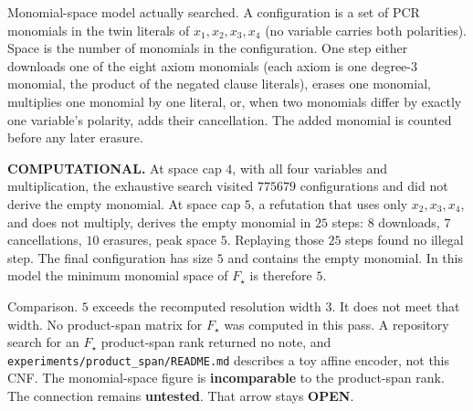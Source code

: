 \documentclass[11pt]{article}
\begin{document}
Monomial-space model actually searched.
A configuration is a set of PCR monomials in the twin literals of \(x_1,x_2,x_3,x_4\)
(no variable carries both polarities).
Space is the number of monomials in the configuration.
One step either downloads one of the eight axiom monomials
(each axiom is one degree-\(3\) monomial, the product of the negated clause literals),
erases one monomial,
multiplies one monomial by one literal,
or, when two monomials differ by exactly one variable's polarity, adds their cancellation.
The added monomial is counted before any later erasure.

\textbf{COMPUTATIONAL.}
At space cap \(4\), with all four variables and multiplication, the exhaustive search visited \(775679\) configurations and did not derive the empty monomial.
At space cap \(5\), a refutation that uses only \(x_2,x_3,x_4\), and does not multiply, derives the empty monomial in \(25\) steps:
\(8\) downloads, \(7\) cancellations, \(10\) erasures, peak space \(5\).
Replaying those \(25\) steps found no illegal step.
The final configuration has size \(5\) and contains the empty monomial.
In this model the minimum monomial space of \(F_\star\) is therefore \(5\).

Comparison.
\(5\) exceeds the recomputed resolution width \(3\).
It does not meet that width.
No product-span matrix for \(F_\star\) was computed in this pass.
A repository search for an \(F_\star\) product-span rank returned no note, and
\texttt{experiments/product\_span/README.md} describes a toy affine encoder, not this CNF.
The monomial-space figure is \textbf{incomparable} to the product-span rank.
The connection remains \textbf{untested}. That arrow stays \textbf{OPEN}.
\end{document}
